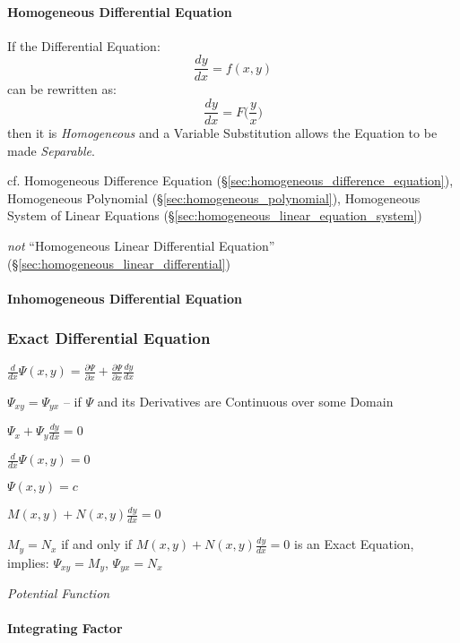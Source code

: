 \paragraph{Homogeneous Differential Equation}
\label{sec:homogeneous_differential_equation}

If the Differential Equation:
\[
  \frac{dy}{dx} = f(x,y)
\]
can be rewritten as:
\[
  \frac{dy}{dx} = F\Big(\frac{y}{x}\Big)
\]
then it is \emph{Homogeneous} and a Variable Substitution allows the Equation to
be made \emph{Separable}.

cf. Homogeneous Difference Equation
(\S\ref{sec:homogeneous_difference_equation}), Homogeneous Polynomial
(\S\ref{sec:homogeneous_polynomial}), Homogeneous System of Linear Equations
(\S\ref{sec:homogeneous_linear_equation_system})

\emph{not} ``Homogeneous Linear Differential Equation''
(\S\ref{sec:homogeneous_linear_differential})



\paragraph{Inhomogeneous Differential Equation}
\label{sec:inhomogeneous_differential_equation}



\subsubsection{Exact Differential Equation}\label{sec:exact_equation}

$\frac{d}{dx}\Psi(x,y) = \frac{\partial{\Psi}}{\partial{x}}
  + \frac{\partial{\Psi}}{\partial{x}}\frac{dy}{dx}$

$\Psi_{xy} = \Psi_{yx}$ -- if $\Psi$ and its Derivatives are Continuous over
some Domain

$\Psi_x + \Psi_y \frac{dy}{dx} = 0$

$\frac{d}{dx}\Psi(x,y) = 0$

$\Psi(x,y) = c$

$M(x,y) + N(x,y)\frac{dy}{dx} = 0$

$M_y = N_x$ if and only if $M(x,y) + N(x,y)\frac{dy}{dx} = 0$ is an Exact
Equation, implies: $\Psi_{xy} = M_y$, $\Psi_{yx} = N_x$

\emph{Potential Function}



\paragraph{Integrating Factor}\label{sec:integrating_factor}\hfill

